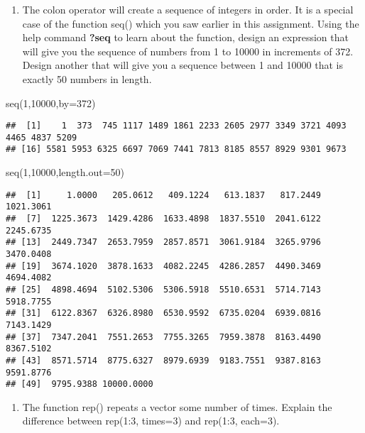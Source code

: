 \documentclass[
]{article}
\newenvironment{Shaded}{\begin{snugshade}}{\end{snugshade}}
\newcommand{\AttributeTok}[1]{\textcolor[rgb]{0.77,0.63,0.00}{#1}}
\newcommand{\DecValTok}[1]{\textcolor[rgb]{0.00,0.00,0.81}{#1}}
\newcommand{\FunctionTok}[1]{\textcolor[rgb]{0.00,0.00,0.00}{#1}}
\newcommand{\NormalTok}[1]{#1}
\providecommand{\tightlist}{%
  \setlength{\itemsep}{0pt}\setlength{\parskip}{0pt}}
\begin{document}
\begin{enumerate}
\def\labelenumi{\alph{enumi}.}
\tightlist
\item
  The colon operator will create a sequence of integers in order. It is
  a special case of the function seq() which you saw earlier in this
  assignment. Using the help command \textbf{?seq} to learn about the
  function, design an expression that will give you the sequence of
  numbers from 1 to 10000 in increments of 372. Design another that will
  give you a sequence between 1 and 10000 that is exactly 50 numbers in
  length.
\end{enumerate}

\begin{Shaded}
\begin{Highlighting}[]
\FunctionTok{seq}\NormalTok{(}\DecValTok{1}\NormalTok{,}\DecValTok{10000}\NormalTok{,}\AttributeTok{by=}\DecValTok{372}\NormalTok{)}
\end{Highlighting}
\end{Shaded}

\begin{verbatim}
##  [1]    1  373  745 1117 1489 1861 2233 2605 2977 3349 3721 4093 4465 4837 5209
## [16] 5581 5953 6325 6697 7069 7441 7813 8185 8557 8929 9301 9673
\end{verbatim}

\begin{Shaded}
\begin{Highlighting}[]
\FunctionTok{seq}\NormalTok{(}\DecValTok{1}\NormalTok{,}\DecValTok{10000}\NormalTok{,}\AttributeTok{length.out=}\DecValTok{50}\NormalTok{)}
\end{Highlighting}
\end{Shaded}

\begin{verbatim}
##  [1]     1.0000   205.0612   409.1224   613.1837   817.2449  1021.3061
##  [7]  1225.3673  1429.4286  1633.4898  1837.5510  2041.6122  2245.6735
## [13]  2449.7347  2653.7959  2857.8571  3061.9184  3265.9796  3470.0408
## [19]  3674.1020  3878.1633  4082.2245  4286.2857  4490.3469  4694.4082
## [25]  4898.4694  5102.5306  5306.5918  5510.6531  5714.7143  5918.7755
## [31]  6122.8367  6326.8980  6530.9592  6735.0204  6939.0816  7143.1429
## [37]  7347.2041  7551.2653  7755.3265  7959.3878  8163.4490  8367.5102
## [43]  8571.5714  8775.6327  8979.6939  9183.7551  9387.8163  9591.8776
## [49]  9795.9388 10000.0000
\end{verbatim}

\begin{enumerate}
\def\labelenumi{\alph{enumi}.}
\setcounter{enumi}{1}
\tightlist
\item
  The function rep() repeats a vector some number of times. Explain the
  difference between rep(1:3, times=3) and rep(1:3, each=3).
\end{enumerate}
\end{document}
